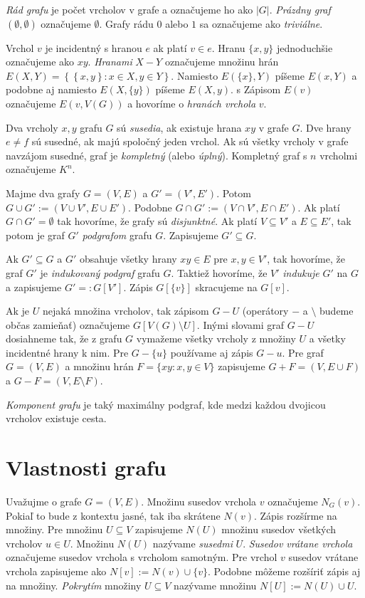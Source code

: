 \emph{Rád grafu} je počet vrcholov v grafe a označujeme ho ako $|G|$.
\emph{Prázdny graf} $(\emptyset, \emptyset )$ označujeme $\emptyset$. Grafy 
rádu $0$ alebo $1$ sa označujeme ako \emph{triviálne}.

Vrchol $v$ je incidentný s hranou $e$ ak platí $v \in e$. Hranu $\{x, y\}$ 
jednoduchšie označujeme ako $xy$. \emph{Hranami} $X-Y$ označujeme množinu 
hrán $E(X,Y) = \left\{ \left\{ x, y\right\} : x \in X, y \in Y\right\} $. 
Namiesto $E(\{x\},Y)$ píšeme $E(x,Y)$ a podobne aj namiesto $E(X,\{y\})$ 
píšeme $E(X,y)$. s
Zápisom $E(v)$ označujeme $E(v, V(G))$ a hovoríme o \emph{hranách vrchola} $v$. 

Dva vrcholy $x, y$ grafu $G$ sú \emph{susedia}, ak existuje hrana $xy$ v grafe 
$G$. Dve hrany $e \neq f$ sú susedné, ak majú spoločný jeden vrchol. Ak sú 
všetky vrcholy v grafe navzájom susedné, graf je \emph{kompletný} (alebo 
\emph{úplný}). Kompletný graf s $n$ vrcholmi označujeme $K^n$.

Majme dva grafy $G = (V,E)$ a $G' = (V', E')$. Potom $G \cup G' := (V \cup V', 
E \cup E')$. Podobne $G \cap G' := (V \cap V', E \cap E')$. Ak platí $G \cap G' 
= \emptyset$ tak hovoríme, že grafy sú \emph{disjunktné}. Ak platí $V \subseteq 
V'$ a $E \subseteq E'$, tak potom je graf $G'$ \emph{podgrafom} grafu $G$. 
Zapisujeme $G' \subseteq G$.

Ak $G' \subseteq G$ a $G'$ obsahuje všetky hrany $xy \in E$ pre $x,y \in V'$, 
tak hovoríme, že graf $G'$ je \emph{indukovaný podgraf} grafu $G$. Taktiež 
hovoríme, že $V'$ \emph{indukuje} $G'$ na $G$ a zapisujeme $G' =: G[V']$. 
Zápis $G[\{v\}]$ skracujeme na $G[v]$.

Ak je $U$ nejaká množina vrcholov, tak zápisom $G - U$ (operátory $-$ a 
$\setminus$ budeme občas zamieňať) označujeme $G[V(G) \setminus U]$. Inými 
slovami graf $G - U$ dosiahneme tak, že z grafu $G$ vymažeme všetky vrcholy z 
množiny $U$ a všetky incidentné hrany k nim. Pre $G - \{u\}$ používame aj zápis 
$G - u$.
Pre graf $G=(V,E)$ a množinu hrán $F = \{xy: x, y \in V\}$ zapisujeme 
$G + F = (V, E \cup F)$ a $G - F = (V, E \setminus F)$.

\emph{Komponent grafu} je taký maximálny podgraf, kde medzi každou dvojicou 
vrcholov existuje cesta.

\section{Vlastnosti grafu}

Uvažujme o grafe $G = (V, E)$. Množinu susedov vrchola $v$ označujeme
$N_G(v)$. Pokiaľ to bude z kontextu jasné, tak iba skrátene $N(v)$. Zápis 
rozšírme na množiny. Pre množinu $U \subseteq V$ zapisujeme $N(U)$ množinu 
susedov všetkých vrcholov $u \in U$. Množinu $N(U)$ nazývame \emph{susedmi} $U$. 
\emph{Susedov vrátane vrchola} označujeme susedov vrchola s vrcholom samotným. 
Pre vrchol $v$ susedov vrátane vrchola zapisujeme ako $N[v] := N(v) \cup \{v\}$. 
Podobne môžeme rozšíriť zápis aj na množiny. \emph{Pokrytím} množiny $U 
\subseteq V$ nazývame množinu $N[U] := N(U) \cup U$.

